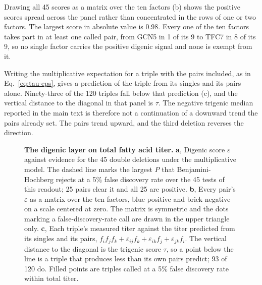  Drawing all 45 scores as a matrix over the ten factors
(b) shows the positive scores spread across the panel rather than
concentrated in the rows of one or two factors. The largest score in absolute value is
0.98. Every one of the ten factors takes part in at least one called pair, from GCN5 in 1
of its 9 to TFC7 in 8 of its 9, so no single factor carries the positive digenic signal
and none is exempt from it.

 Writing the multiplicative expectation for a triple
with the pairs included, as in Eq.~\ref{eq:tau-eps}, gives a prediction of the triple
from its singles and its pairs alone. Ninety-three of the 120 triples fall below that
prediction (c), and the vertical distance to the diagonal in that
panel is $\tau$. The negative trigenic median reported in the main text is therefore not a
continuation of a downward trend the pairs already set. The pairs trend upward, and the
third deletion reverses the direction.

\begin{figure}[t]
\caption{\textbf{The digenic layer on total fatty acid titer.} \textbf{a}, Digenic score
$\varepsilon$ against evidence for the 45 double deletions under the multiplicative model.
The dashed line marks the largest $P$ that Benjamini-Hochberg rejects at a 5\% false
discovery rate over the 45 tests of this readout; 25 pairs clear it and all 25 are
positive. \textbf{b}, Every pair's $\varepsilon$ as a matrix over the ten factors, blue
positive and brick negative on a scale centered at zero. The matrix is symmetric and the
dots marking a false-discovery-rate call are drawn in the upper triangle only.
\textbf{c}, Each triple's measured titer against the titer predicted from its singles and
its pairs, $f_i f_j f_k + \varepsilon_{ij} f_k + \varepsilon_{ik} f_j + \varepsilon_{jk}
f_i$. The vertical distance to the diagonal is the trigenic score $\tau$, so a point below
the line is a triple that produces less than its own pairs predict; 93 of 120 do. Filled
points are triples called at a 5\% false discovery rate within total titer.}
\label{fig:si-digenic}
\end{figure}


